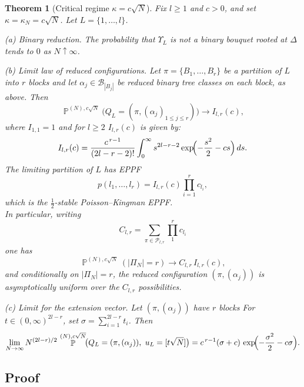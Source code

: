 \documentclass[11pt]{article}
\DeclareMathOperator{\NN}{\mathbb{N}}
\DeclareMathOperator{\PP}{\mathbb{P}}
\newtheorem{theorem}{Theorem}[section]
\begin{document}
 \begin{theorem}[Critical regime $\kappa=c\sqrt N$]\label{thm:critical}
Fix $l\ge 1$ and $c>0$, and set $\kappa=\kappa_N=c\sqrt N$.
Let $L=\{1,\dots,l\}$.

\smallskip
\noindent
(a) \emph{Binary reduction.}
The probability that $\Upsilon_L$ is not a binary bouquet rooted at $\Delta$
tends to $0$ as $N\uparrow\infty$.

\smallskip
\noindent
(b) \emph{Limit law of reduced configurations.}
Let $\pi=\{B_1,\dots,B_r\}$ be a partition of $L$ into $r$ blocks and let
$\alpha_j\in\mathcal B_{|B_j|}$ be reduced binary tree classes on each block, as above.
Then
\[
\PP^{(N),c\sqrt N}\!\bigl(Q_L=(\pi,(\alpha_j)_{1\le j\le r})\bigr)
\longrightarrow
I_{l,r}(c),
\]
where  $I_{1,1}=1$ and for $l\ge 2$ $I_{l,r}(c)$ is given by:
\begin{equation}\label{eq:Ilr-1d}
I_{l,r}(c)=\frac{c^{\,r-1}}{(2l-r-2)!}\int_0^\infty
s^{2l-r-2}\exp\!\Bigl(-\frac{s^2}{2}-cs\Bigr)\,ds.
\end{equation}
The limiting partition of $L$ has EPPF
\[
p(l_1,\dots,l_r)
=
I_{l,r}(c)\prod_{i=1}^r c_{l_i},
\]
which is the \(\tfrac12\)-stable Poisson--Kingman EPPF.\\
In particular, writing
\[
C_{l,r}
=
\sum_{\pi\in\mathcal P_{l,r}} \prod_1^rc_{l_i}
\]
one has
\[
\PP^{(N),c\sqrt N}(|\Pi_N|=r)\longrightarrow C_{l,r}\,I_{l,r}(c),
\]
and conditionally on $|\Pi_N|=r$, the reduced configuration
$(\pi,(\alpha_j))$ is asymptotically uniform over the $C_{l,r}$ possibilities.

\smallskip
\noindent
(c) \emph{Limit for the extension vector.}
Let $(\pi,(\alpha_j))$ have $r$ blocks
For $t\in (0,\infty)^{2l-r}$, 
set $\sigma=\sum_{i=1}^{2l-r} t_i$.
Then
\[
\lim_{N\to\infty}
N^{(2l-r)/2}\,
\PP^{(N),c\sqrt N}\!\bigl(Q_L=(\pi,(\alpha_j)),\ u_L=[t\sqrt N]\bigr)
=
c^{\,r-1}(\sigma+c)\,
\exp\!\Bigl(-\frac{\sigma^2}{2}-c\sigma\Bigr).
\]
\end{theorem}
 
 \subsection{Proof}
 
\end{document}
